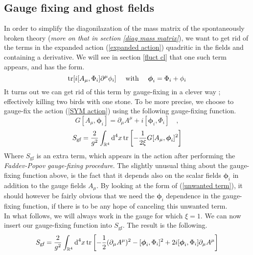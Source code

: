 \subsection{Gauge fixing and ghost fields}\label{gauge-fixing}
In order to simplify the diagonilazation of the mass matrix of the spontaneously broken theory (\textit{more on that in section \ref{diag mass matrix}}), we want to get rid of the terms in the expanded action (\ref{expanded action}) quadritic in the fields and containing a derivative. We will see in section \ref{fluct cl} that one such term appears, and has the form.
%
%
\begin{equation}\label{unwanted term}
\tr[i [A_\mu, \Phi_i] \partial^\mu \phi_i]
%
\quad \text{ with } \quad
%
\boldsymbol{\phi}_i = \Phi_i + \phi_i
\end{equation}
%
%
It turns out we can get rid of this term by gauge-fixing in a clever way \cite{One-point functions in D5-D3}; effectively killing two birds with one stone. To be more precise, we choose to gauge-fix the action (\ref{SYM action}) using the following gauge-fixing function.
%
%
\begin{equation*}
G[A_\mu,\boldsymbol{\phi}_i] = \partial_\mu A^\mu + i [\boldsymbol{\phi}_i, \Phi_i]
%
\quad ,
\end{equation*}
%
%
\begin{equation}
S_{\text{gf}} = \frac{2}{g^2} \int_{\mathbb{R}^4} \text{d}^4 x
\tr \left[
-\frac{1}{2 \xi} G[A_\mu, \boldsymbol{\phi}_i]^2
\right]
\end{equation}
%
%
Where $S_{\text{gf}}$ is an extra term, which appears in the action after performing the \textit{Faddev-Popov gauge-fixing procedure}. The slightly unusual thing about the gauge-fixing function above, is the fact that it depends also on the scalar fields $\boldsymbol{\phi}_i$ in addition to the gauge fields $A_\mu$. By looking at the form of (\ref{unwanted term}), it should however be fairly obvious that we need the $\boldsymbol{\phi}_i$ dependence in the gauge-fixing function, if there is to be any hope of canceling this unwanted term.\\
In what follows, we will always work in the gauge for which $\xi = 1$. We can now insert our gauge-fixing function into $S_{\text{gf}}$. The result is the following.
\begin{equation*}
S_{\text{gf}} = \frac{2}{g^2} \int_{\mathbb{R}^4} \text{d}^4 x
\tr \left[
-\frac{1}{2}
(\partial_\mu A^\mu)^2
- [\boldsymbol{\phi}_i, \Phi_i]^2
+ 2 i [\boldsymbol{\phi}_i, \Phi_i] \partial_\mu A^\mu
\right]
\end{equation*}
